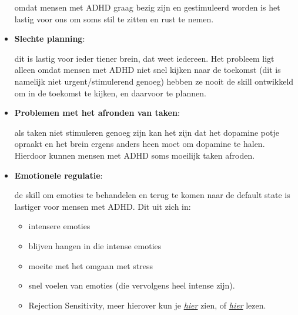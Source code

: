 \documentclass{article}
\begin{document}
\begin{itemize}
                            omdat mensen met ADHD graag bezig zijn en gestimuleerd worden is het lastig voor ons om soms stil te zitten en rust te nemen.

                        \item \textbf{Slechte planning}: 

                            dit is lastig voor ieder tiener brein, dat weet iedereen. Het probleem ligt alleen omdat mensen met ADHD niet snel kijken naar de toekomst (dit is namelijk niet urgent/stimulerend genoeg) hebben ze nooit de skill ontwikkeld om in de toekomst te kijken, en daarvoor te plannen. 

                        \item \textbf{Problemen met het afronden van taken}: 

                            als taken niet stimuleren genoeg zijn kan het zijn dat het dopamine potje opraakt en het brein ergens anders heen moet om dopamine te halen. Hierdoor kunnen mensen met ADHD soms moeilijk taken afroden.
                        
                        \item \textbf{Emotionele regulatie}: 

                            de skill om emoties te behandelen en terug te komen naar de default state is lastiger voor mensen met ADHD. Dit uit zich in:

                            \begin{itemize}
                                \item intensere emoties
                                \item blijven hangen in die intense emoties
                                \item moeite met het omgaan met stress
                                \item snel voelen van emoties (die vervolgens heel intense zijn). 
                                \item Rejection Sensitivity, meer hierover kun je \hyperlink{https://www.youtube.com/watch?v=ZQ44ynEjsHQ&ab_channel=KatiMorton}{\emph{hier}}\cite{ADHD-video-rejection-sensitivity} zien, of \hyperlink{https://my.clevelandclinic.org/health/diseases/24099-rejection-sensitive-dysphoria-rsd}{\emph{hier}} lezen\cite{ADHD-rejection-sensitivity}.
                            \end{itemize}

                \end{itemize}
                
\end{document}

